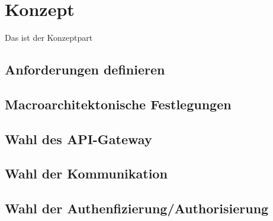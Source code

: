 \section{Konzept}
Das ist der Konzeptpart

\subsection{Anforderungen definieren}

\subsection{Macroarchitektonische Festlegungen}

\subsection{Wahl des API-Gateway}

\subsection{Wahl der Kommunikation}

\subsection{Wahl der Authenfizierung/Authorisierung}

